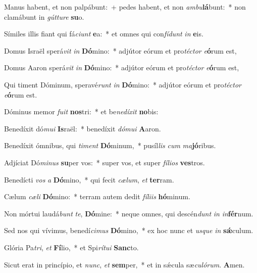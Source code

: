 \item Manus habent, et non palpábunt:~+ pedes habent, et non \textit{am}\textit{bu}\textbf{lá}bunt:~* non clamábunt in \textit{gút}\textit{tu}\textit{re} \textbf{su}o.

\item Símiles illis fiant qui fá\textit{ci}\textit{unt} \textbf{e}a:~* et omnes qui con\textit{fí}\textit{dunt} \textit{in} \textbf{e}is.

\item Domus Israël sperá\textit{vit} \textit{in} \textbf{Dó}mino:~* adjútor eórum et pro\textit{téc}\textit{tor} \textit{e}\textbf{ó}rum est,

\item Domus Aaron sperá\textit{vit} \textit{in} \textbf{Dó}mino:~* adjútor eórum et pro\textit{téc}\textit{tor} \textit{e}\textbf{ó}rum est,

\item Qui timent Dóminum, speravé\textit{runt} \textit{in} \textbf{Dó}mino:~* adjútor eórum et pro\textit{téc}\textit{tor} \textit{e}\textbf{ó}rum est.

\item Dóminus memor \textit{fu}\textit{it} \textbf{nos}tri:~* et be\textit{ne}\textit{dí}\textit{xit} \textbf{no}bis:

\item Benedíxit dó\textit{mu}\textit{i} \textbf{Is}raël:~* benedíxit \textit{dó}\textit{mu}\textit{i} \textbf{A}aron.

\item Benedíxit ómnibus, qui \textit{ti}\textit{ment} \textbf{Dó}minum,~* pusíl\textit{lis} \textit{cum} \textit{ma}\textbf{jó}ribus.

\item Adjíciat Dó\textit{mi}\textit{nus} \textbf{su}per vos:~* super vos, et super \textit{fí}\textit{li}\textit{os} \textbf{ves}tros.

\item Benedícti \textit{vos} \textit{a} \textbf{Dó}mino,~* qui fecit \textit{cæ}\textit{lum}, \textit{et} \textbf{ter}ram.

\item Cælum \textit{cæ}\textit{li} \textbf{Dó}mino:~* terram autem dedit \textit{fí}\textit{li}\textit{is} \textbf{hó}minum.

\item Non mórtui laudá\textit{bunt} \textit{te}, \textbf{Dó}mine:~* neque omnes, qui descén\textit{dunt} \textit{in} \textit{in}\textbf{fér}num.

\item Sed nos qui vívimus, benedí\textit{ci}\textit{mus} \textbf{Dó}mino,~* ex hoc nunc et \textit{us}\textit{que} \textit{in} \textbf{sǽ}culum.

\item Glória Pa\textit{tri}, \textit{et} \textbf{Fí}lio,~* et Spi\textit{rí}\textit{tu}\textit{i} \textbf{Sanc}to.

\item Sicut erat in princípio, et \textit{nunc}, \textit{et} \textbf{sem}per,~* et in sǽcula sæ\textit{cu}\textit{ló}\textit{rum}. \textbf{A}men.
